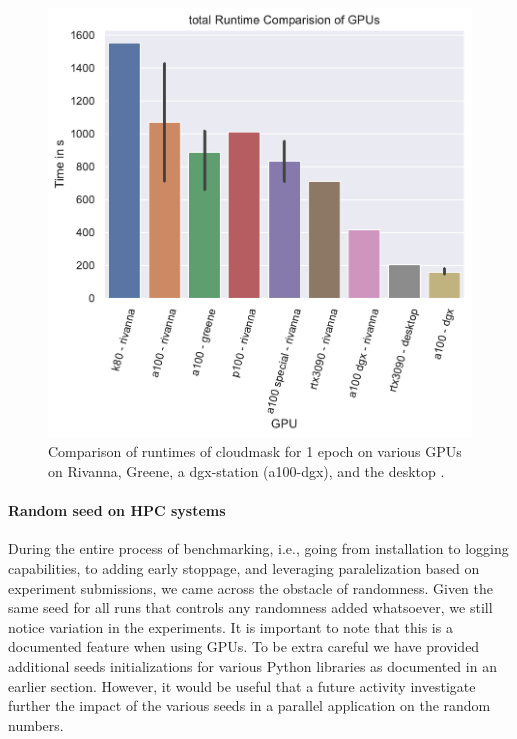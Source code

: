 \documentclass[sigplan,screen]{acmart}
\begin{document}
\begin{figure}[ht]
\centering\includegraphics[width=1.0\columnwidth]{images/gregor-epoch-1.pdf}
\caption{Comparison of runtimes of cloudmask for 1 epoch on various GPUs on Rivanna, Greene, a dgx-station (a100-dgx), and the desktop \cite{las-2023-escience-cloudmask}.}
\label{fig:epoch-compare}
\end{figure}


\paragraph{Random seed on HPC systems} During the entire process of benchmarking, i.e., going from installation to logging capabilities, to adding early stoppage, and leveraging paralelization based on experiment submissions, we came across the obstacle of randomness. Given the same seed for all runs that controls any randomness added whatsoever, we still notice variation in the experiments. It is important to note that this is a documented feature when using GPUs. To be extra careful we have provided additional seeds initializations for various Python libraries as documented in an earlier section. However, it would be useful that a future activity investigate further the impact of the various seeds in a parallel application on the random numbers.
\end{document}
